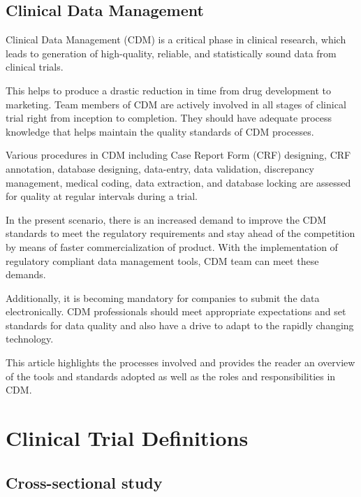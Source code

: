 \subsection{Clinical Data Management}

Clinical Data Management (CDM) is a critical phase in clinical research, which leads to 
generation of high-quality, reliable, and statistically sound data from clinical trials.

This helps to produce a drastic reduction in time from drug development to marketing. 
Team members of CDM are actively involved in all stages of clinical trial right from 
inception to completion. They should have adequate process knowledge that helps maintain 
the quality standards of CDM processes. 

Various procedures in CDM including Case Report Form (CRF) designing, CRF annotation, 
database designing, data-entry, data validation, discrepancy management, medical coding, 
data extraction, and database locking are assessed for quality at regular intervals during a trial. 

In the present scenario, there is an increased demand to improve the CDM standards to meet 
the regulatory requirements and stay ahead of the competition by means of faster commercialization 
of product. With the implementation of regulatory compliant data management tools, 
CDM team can meet these demands. 

Additionally, it is becoming mandatory for companies to submit the data electronically. 
CDM professionals should meet appropriate expectations and set standards for data quality 
and also have a drive to adapt to the rapidly changing technology. 

This article highlights the processes involved and provides the reader an overview of 
the tools  and standards adopted as well as the roles and responsibilities in CDM.



\section{Clinical Trial Definitions}

\subsection{Cross-sectional study}

